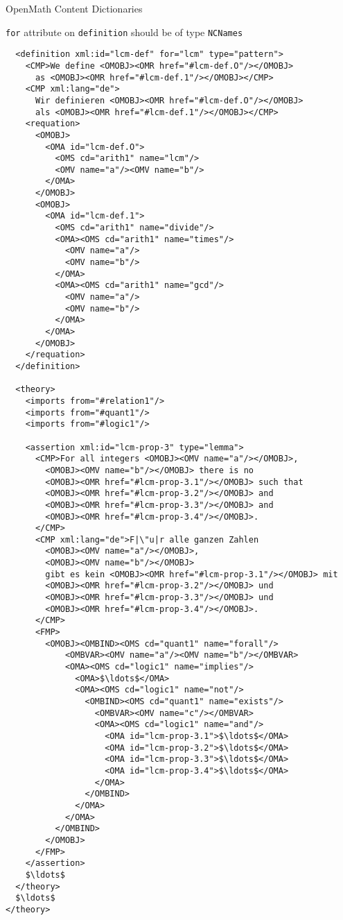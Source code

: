 \begin{tchapter}[id=omcds]{OpenMath Content Dictionaries}
\begin{erratum}[reported-by=Michael Kohlhase,date=2009-08-11]{{\texttt{for}} attribute on
    {\texttt{definition}} should be of type {\texttt{NCNames}}}
\begin{lstlisting}
  <definition xml:id="lcm-def" for="lcm" type="pattern">
    <CMP>We define <OMOBJ><OMR href="#lcm-def.O"/></OMOBJ> 
      as <OMOBJ><OMR href="#lcm-def.1"/></OMOBJ></CMP>
    <CMP xml:lang="de">
      Wir definieren <OMOBJ><OMR href="#lcm-def.O"/></OMOBJ> 
      als <OMOBJ><OMR href="#lcm-def.1"/></OMOBJ></CMP>
    <requation>
      <OMOBJ>
        <OMA id="lcm-def.O">
          <OMS cd="arith1" name="lcm"/>
          <OMV name="a"/><OMV name="b"/>
        </OMA>
      </OMOBJ>
      <OMOBJ>
        <OMA id="lcm-def.1">
          <OMS cd="arith1" name="divide"/>
          <OMA><OMS cd="arith1" name="times"/>
            <OMV name="a"/>
            <OMV name="b"/>
          </OMA>
          <OMA><OMS cd="arith1" name="gcd"/>
            <OMV name="a"/>
            <OMV name="b"/>
          </OMA>
        </OMA>
      </OMOBJ>
    </requation>
  </definition>

  <theory>
    <imports from="#relation1"/>
    <imports from="#quant1"/>
    <imports from="#logic1"/>

    <assertion xml:id="lcm-prop-3" type="lemma">
      <CMP>For all integers <OMOBJ><OMV name="a"/></OMOBJ>, 
        <OMOBJ><OMV name="b"/></OMOBJ> there is no 
        <OMOBJ><OMR href="#lcm-prop-3.1"/></OMOBJ> such that 
        <OMOBJ><OMR href="#lcm-prop-3.2"/></OMOBJ> and 
        <OMOBJ><OMR href="#lcm-prop-3.3"/></OMOBJ> and 
        <OMOBJ><OMR href="#lcm-prop-3.4"/></OMOBJ>.
      </CMP>
      <CMP xml:lang="de">F|\"u|r alle ganzen Zahlen 
        <OMOBJ><OMV name="a"/></OMOBJ>, 
        <OMOBJ><OMV name="b"/></OMOBJ> 
        gibt es kein <OMOBJ><OMR href="#lcm-prop-3.1"/></OMOBJ> mit   
        <OMOBJ><OMR href="#lcm-prop-3.2"/></OMOBJ> und 
        <OMOBJ><OMR href="#lcm-prop-3.3"/></OMOBJ> und 
        <OMOBJ><OMR href="#lcm-prop-3.4"/></OMOBJ>.
      </CMP>
      <FMP>
        <OMOBJ><OMBIND><OMS cd="quant1" name="forall"/>
            <OMBVAR><OMV name="a"/><OMV name="b"/></OMBVAR>
            <OMA><OMS cd="logic1" name="implies"/>
              <OMA>$\ldots$</OMA>
              <OMA><OMS cd="logic1" name="not"/>
                <OMBIND><OMS cd="quant1" name="exists"/>
                  <OMBVAR><OMV name="c"/></OMBVAR>
                  <OMA><OMS cd="logic1" name="and"/>
                    <OMA id="lcm-prop-3.1">$\ldots$</OMA>
                    <OMA id="lcm-prop-3.2">$\ldots$</OMA>
                    <OMA id="lcm-prop-3.3">$\ldots$</OMA>
                    <OMA id="lcm-prop-3.4">$\ldots$</OMA>
                  </OMA>
                </OMBIND>
              </OMA>
            </OMA>
          </OMBIND>
        </OMOBJ>
      </FMP>
    </assertion> 
    $\ldots$
  </theory>
  $\ldots$
</theory>
\end{lstlisting}
\end{erratum}


\end{tchapter}
